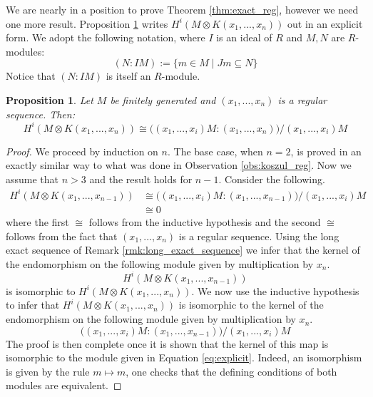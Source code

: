 \documentclass[12pt]{article}
\theoremstyle{plain}
\newtheorem{proposition}[thm]{Proposition}
\theoremstyle{definition}
\begin{document}
We are nearly in a position to prove Theorem \ref{thm:exact_reg}, however we need one more result. Proposition \ref{prop:kozology_explicit} writes $H^i(M \otimes K(x_1,...,x_n))$ out in an explicit form. We adopt the following notation, where $I$ is an ideal of $R$ and $M,N$ are $R$-modules:
\begin{equation}
	(N:IM) := \lbrace m \in M \mid Jm \subseteq N\rbrace
\end{equation}
Notice that $(N:IM)$ is itself an $R$-module.
\begin{proposition}\label{prop:kozology_explicit}
	Let $M$ be finitely generated and $(x_1,...,x_n)$ is a regular sequence. Then:
	\begin{equation}\label{eq:explicit}
		H^i(M \otimes K(x_1,...,x_n)) \cong \big((x_1,...,x_i)M:(x_1,...,x_n)\big)/(x_1,...,x_i)M
	\end{equation}
\end{proposition}
\begin{proof}
	We proceed by induction on $n$. The base case, when $n = 2$, is proved in an exactly similar way to what was done in Observation \ref{obs:koszul_reg}. Now we assume that $n > 3$ and the result holds for $n-1$. Consider the following.
	\begin{align*}
		H^i(M \otimes K(x_1,...,x_{n-1})) &\cong \big((x_1,...,x_i)M:(x_1,...,x_{n-1})\big)/(x_1,...,x_i)M\\
		&\cong 0
	\end{align*}
	where the first $\cong$ follows from the inductive hypothesis and the second $\cong$ follows from the fact that $(x_1,...,x_n)$ is a regular sequence. Using the long exact sequence of Remark \ref{rmk:long_exact_sequence} we infer that the kernel of the endomorphism on the following module given by multiplication by $x_n$.
	\begin{equation}
		H^{i}(M \otimes K(x_1,...,x_{n-1}))
	\end{equation}
	is isomorphic to $H^{i}(M \otimes K(x_1,...,x_n))$. We now use the inductive hypothesis to infer that $H^i(M \otimes K(x_1,...,x_n))$ is isomorphic to the kernel of the endomorphism on the following module given by multiplication by $x_n$.
	\begin{equation}
		\big((x_1,...,x_i)M:(x_1,...,x_{n-1})\big)/(x_1,...,x_i)M
	\end{equation}
	The proof is then complete once it is shown that the kernel of this map is isomorphic to the module given in Equation \ref{eq:explicit}. Indeed, an isomorphism is given by the rule $m \longmapsto m$, one checks that the defining conditions of both modules are equivalent.
\end{proof}
\end{document}
